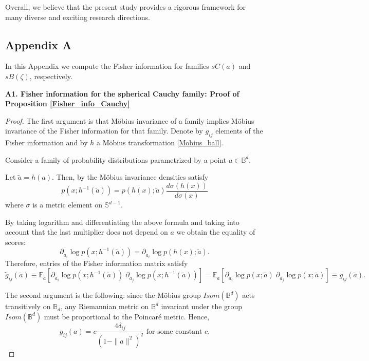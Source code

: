 \documentclass{article}
\theoremstyle{plain}%
\theoremstyle{definition}
\theoremstyle{remark}
\theoremstyle{prop}
\begin{document}
Overall, we believe that the present study provides a rigorous framework for many diverse and exciting research directions.




\begin{appendices}

\section{Appendix A}

In this Appendix we compute the Fisher information for families $sC(a)$ and $sB(\zeta)$, respectively.

{\bf A1. Fisher information for the spherical Cauchy family: Proof of Proposition \ref{Fisher_info_Cauchy}}

\begin{proof}

The first argument is that M\" obius invariance of a family implies M\" obius invariance of the Fisher information for that family. Denote by $g_{ij}$ elements of the Fisher information and by $h$ a M\" obius transformation \eqref{Mobius_ball}.

Consider a family of probability distributions parametrized by a point $a \in \mathbb{B}^d$.

Let $\tilde a = h(a)$. Then, by the M\" obius invariance densities satisfy
$$
p(x;h^{-1}(\tilde a)) = p(h(x);\tilde a) \frac{d \sigma(h(x))}{d \sigma(x)}
$$
where $\sigma$ is a metric element on $\mathbb S^{d-1}$.

By taking logarithm and differentiating the above formula and taking into account that the last multiplier does not depend on $a$ we obtain the equality of scores:
$$
\partial_{\tilde a_i} \log p(x;h^{-1}(\tilde a)) = \partial_{\tilde a_i} \log p(h(x);\tilde a).
$$
Therefore, entries of the Fisher information matrix satisfy
$$
\tilde g_{ij}(\tilde a) \equiv \mathbb{E}_{\tilde a} [\partial_{\tilde a_i}\log p(x;h^{-1}(\tilde a)) \; \partial_{\tilde a_j} \log p(x;h^{-1}(\tilde a))] = \mathbb{E}_{\tilde a} [\partial_{\tilde a_i} \log p(x;\tilde a) \; \partial_{\tilde a_j} \log p(x;\tilde a)] \equiv g_{ij}(\tilde a).
$$

The second argument is the following: since the M\" obius group $Isom(\mathbb{B}^d)$ acts transitively on $\mathbb{B}_d$, any Riemannian metric on $\mathbb B^d$ invariant under the group $Isom(\mathbb{B}^d)$ must be proportional to the Poincar\' e metric. Hence, 
$$
g_{ij}(a) = c \frac{4 \delta_{ij}}{(1 - \| a\|^2)^2} \mbox{  for some constant } c. 
$$


\end{proof}
\end{appendices}
\end{document}
